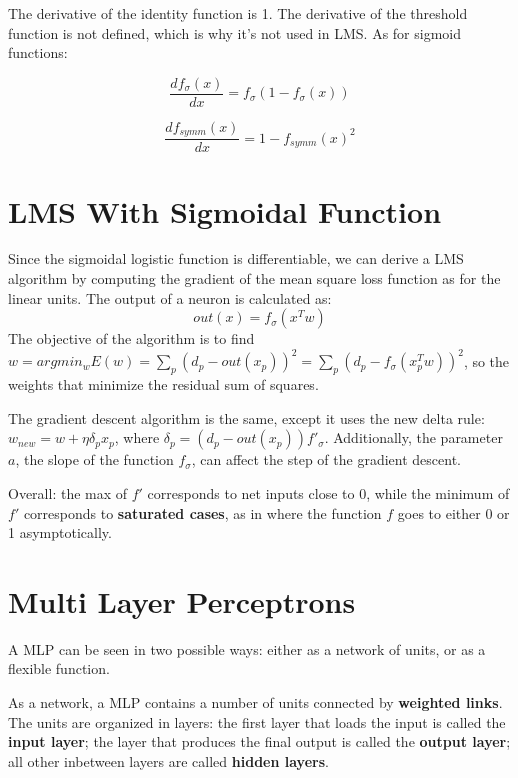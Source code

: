The derivative of the identity function is 1. The derivative of the threshold function is not defined, which is why it's not used in LMS. As for sigmoid functions:

\begin{equation*}
    \dfrac{df_{\sigma}(x)}{dx} = f_{\sigma}(1-f_{\sigma}(x)) 
\end{equation*}

\begin{equation*}
    \dfrac{df_{symm}(x)}{dx} = 1 - f_{symm}(x)^2
\end{equation*}

\section{LMS With Sigmoidal Function}

Since the sigmoidal logistic function is differentiable, we can derive a LMS algorithm by computing the gradient of the mean square loss function as for the linear units. The output of a neuron is calculated as:
\begin{equation*}
    out(x) = f_{\sigma}(x^Tw)
\end{equation*}
The objective of the algorithm is to find $w = argmin_w E(w) = \sum_p (d_p - out(x_p))^2 = \sum_p (d_p - f_{\sigma}(x_p^Tw))^2$, so the weights that minimize the residual sum of squares.

The gradient descent algorithm is the same, except it uses the new delta rule: $w_{new} = w + \eta \delta_p x_p$, where $\delta_p = (d_p - out(x_p))f'_{\sigma}$. Additionally, the parameter $a$, the slope of the function $f_{\sigma}$, can affect the step of the gradient descent.

Overall: the max of $f'$ corresponds to net inputs close to 0, while the minimum of $f'$ corresponds to \textbf{saturated cases}, as in where the function $f$ goes to either 0 or 1 asymptotically.

\section{Multi Layer Perceptrons}

A MLP can be seen in two possible ways: either as a network of units, or as a flexible function.

As a network, a MLP contains a number of units connected by \textbf{weighted links}. The units are organized in layers: the first layer that loads the input is called the \textbf{input layer}; the layer that produces the final output is called the \textbf{output layer}; all other inbetween layers are called \textbf{hidden layers}.

